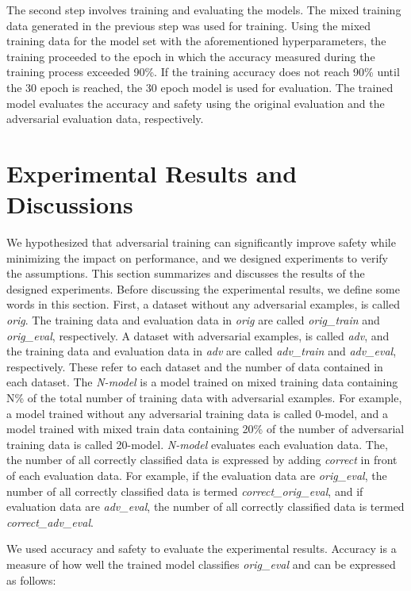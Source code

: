 \documentclass[journal,article,submit,moreauthors,pdftex]{Definitions/mdpi}
\begin{document}
The second step involves training and evaluating the models.
The mixed training data generated in the previous step was used for training.
Using the mixed training data for the model set with the aforementioned hyperparameters, the training proceeded to the epoch in which the accuracy measured during the training process exceeded 90\%.
If the training accuracy does not reach 90\% until the 30 epoch is reached, the 30 epoch model is used for evaluation.
The trained model evaluates the accuracy and safety using the original evaluation and the adversarial evaluation data, respectively.

\section{Experimental Results and Discussions}

We hypothesized that adversarial training can significantly improve safety while minimizing the impact on performance, and we designed experiments to verify the assumptions.
This section summarizes and discusses the results of the designed experiments.
Before discussing the experimental results, we define some words in this section.
First, a dataset without any adversarial examples, is called {\it orig}. The training data and evaluation data in {\it orig} are called {\it orig\_train} and {\it orig\_eval}, respectively.
A dataset with adversarial examples, is called {\it adv}, and the training data and evaluation data in {\it adv} are called {\it adv\_train} and {\it adv\_eval}, respectively.
These refer to each dataset and the number of data contained in each dataset.
The {\it N-model} is a model trained on mixed training data containing N\% of the total number of training data with adversarial examples.
For example, a model trained without any adversarial training data is called 0-model, and a model trained with mixed train data containing 20\% of the number of adversarial training data is called 20-model.
{\it N-model} evaluates each evaluation data. The, the number of all correctly classified data is expressed by adding {\it correct} in front of each evaluation data.
For example, if the evaluation data are {\it orig\_eval}, the number of all correctly classified data is termed {\it correct\_orig\_eval}, and if evaluation data are {\it adv\_eval}, the number of all correctly classified data is termed {\it correct\_adv\_eval}.

We used accuracy and safety to evaluate the experimental results. Accuracy is a measure of how well the trained model classifies {\it orig\_eval} and can be expressed as follows:
\end{document}
